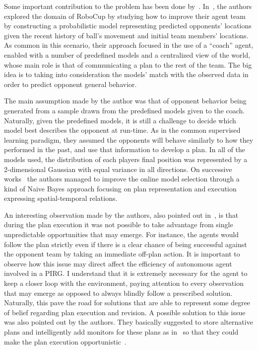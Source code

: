 Some important contribution to the problem has been done by~\cite{Riley&Veloso2000,Riley&Veloso2002,Riley&Veloso2001a,Riley&Veloso2001b}. In~\cite{Riley&Veloso2002}, the authors explored the domain of RoboCup by studying how to improve their agent team by constructing a probabilistic model representing predicted opponents' locations given the recent history of ball's movement and initial team members' locations. As common in this scenario, their approach focused in the use of a ``coach'' agent, enabled with a number of predefined models and a centralized view of the world, whose main role is that of communicating a plan to the rest of the team. The big idea is to taking into consideration the models' match with the observed data in order to predict opponent general behavior. 

The main assumption made by the author was that of opponent behavior being generated from a sample drawn from the predefined models given to the coach. Naturally, given the predefined models, it is still a challenge to decide which model best describes the opponent at run-time. As in the common supervised learning paradigm, they assumed the opponents will behave similarly to how they performed in the past, and use that information to develop a plan. In all of the models used, the distribution of each players final position was represented by a 2-dimensional Gaussian with equal variance in all directions. On successive works~\cite{Riley&Veloso2001a,Riley&Veloso2001b} the authors managed to improve the online model selection through a kind of Naive Bayes approach focusing on plan representation and execution expressing spatial-temporal relations. 

An interesting observation made by the authors, also pointed out in~\cite{OppRobocup}, is that during the plan execution it was not possible to take advantage from single unpredictable opportunities that may emerge. For instance, the agents would follow the plan strictly even if there is a clear chance of being successful against the opponent team by taking an immediate off-plan action. It is important to observe how this issue may direct affect the efficiency of autonomous agent involved in a PIRG. I understand that it is extremely necessary for the agent to keep a closer loop with the environment, paying attention to every observation that may emerge as opposed to always blindly follow a prescribed solution. Naturally, this pave the road for solutions that are able to represent some degree of belief regarding plan execution and revision. A possible solution to this issue was also pointed out by the authors. They basically suggested to store alternative plans and intelligently add monitors for these plans as in~\cite{Veloso1998} so that they could make the plan execution opportunistic~\cite{Riley&Veloso2001a,Riley&Veloso2001b,OppRobocup}.

